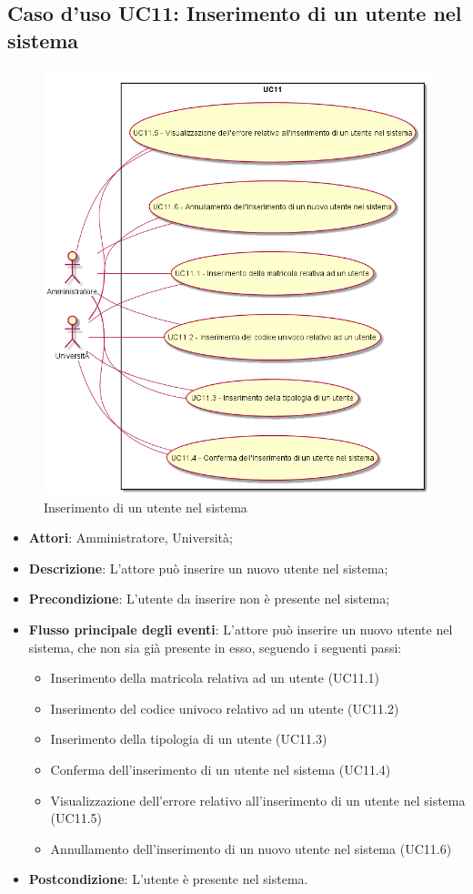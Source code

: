 \subsection{Caso d'uso \texorpdfstring{UC11}{UC11}: Inserimento di un utente nel sistema}
\begin{figure} [H]
\centering
\includegraphics[scale=0.45]{./img/UC11.png}
\caption{Inserimento di un utente nel sistema}\label{}
\end{figure}
\begin{itemize}
\item \textbf{Attori}: Amministratore, Università;
\item \textbf{Descrizione}: L'attore può inserire un nuovo utente nel sistema;
\item \textbf{Precondizione}: L'utente da inserire non è presente nel sistema;
\item \textbf{Flusso principale degli eventi}: L'attore può inserire un nuovo utente nel sistema, che non sia già presente in esso, seguendo i seguenti passi:
\begin{itemize}
\item Inserimento della matricola relativa ad un utente (UC11.1)
\item Inserimento del codice univoco relativo ad un utente (UC11.2)
\item Inserimento della tipologia di un utente  (UC11.3)
\item Conferma dell'inserimento di un utente nel sistema (UC11.4)
\item Visualizzazione dell'errore relativo all'inserimento di un utente nel sistema (UC11.5)
\item Annullamento dell'inserimento di un nuovo utente nel sistema (UC11.6)
\end{itemize}
\item \textbf{Postcondizione}: L'utente è presente nel sistema.
\end{itemize}
